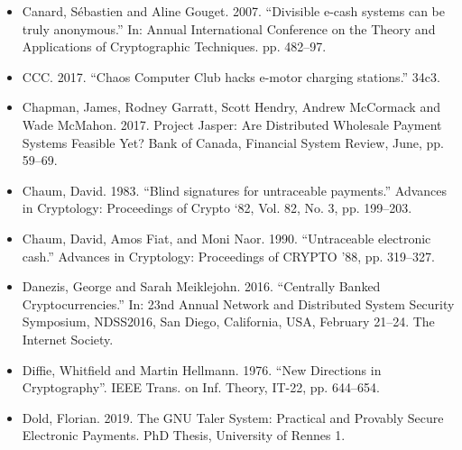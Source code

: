 \documentclass[10pt,spanish]{article}
\begin{document}
\begin{itemize}
\item Canard, Sébastien and Aline Gouget. 2007. ``Divisible e-cash systems can
be truly anonymous.'' In: Annual International Conference on the Theory
and Applications of Cryptographic Techniques. pp. 482--97.
\end{itemize}

\begin{itemize}
\item CCC. 2017. ``Chaos Computer Club hacks e-motor charging stations.''
34c3.
\end{itemize}

\begin{itemize}
\item Chapman, James, Rodney Garratt, Scott Hendry, Andrew McCormack and Wade
McMahon. 2017. Project Jasper: Are Distributed Wholesale Payment Systems
Feasible Yet? Bank of Canada, Financial System Review, June, pp. 59--69.
\end{itemize}

\begin{itemize}
\item Chaum, David. 1983. ``Blind signatures for untraceable payments.''
Advances in Cryptology: Proceedings of Crypto `82, Vol. 82, No. 3, pp.
199--203.
\end{itemize}

\begin{itemize}
\item Chaum, David, Amos Fiat, and Moni Naor. 1990. ``Untraceable electronic
cash.'' Advances in Cryptology: Proceedings of CRYPTO '88, pp. 319--327.
\end{itemize}

\begin{itemize}
\item Danezis, George and Sarah Meiklejohn. 2016. ``Centrally Banked
Cryptocurrencies.'' In: 23nd Annual Network and Distributed System
Security Symposium, NDSS2016, San Diego, California, USA, February
21--24. The Internet Society.
\end{itemize}

\begin{itemize}
\item Diﬃe, Whitfield and Martin Hellmann. 1976. ``New Directions in
Cryptography''. IEEE Trans. on Inf. Theory, IT-22, pp. 644--654.
\end{itemize}

\begin{itemize}
\item Dold, Florian. 2019. The GNU Taler System: Practical and Provably Secure
Electronic Payments. PhD Thesis, University of Rennes 1.
\end{itemize}
\end{document}
